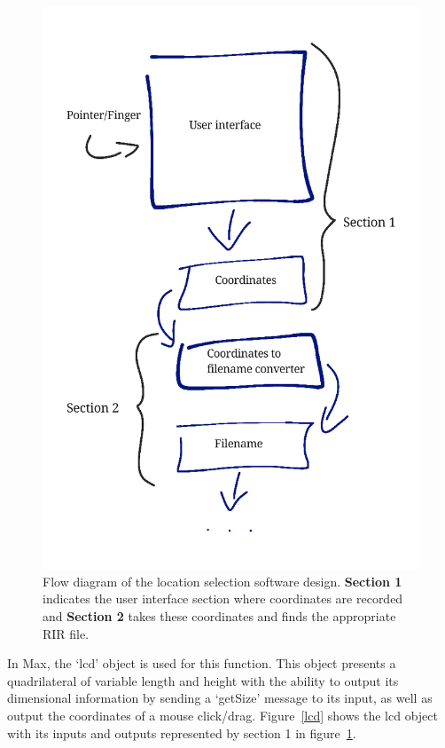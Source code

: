 \documentclass[../../main.tex]{subfiles}
\begin{document}
			\begin{figure}[h]
				\centerline{\includegraphics[scale = 0.25]{Sections/Implementation/Max/images/FlowDiagrams/Max1_V2.png}}
				\caption{Flow diagram of the location selection software design. \textbf{Section 1} indicates the user interface section where coordinates are recorded and \textbf{Section 2} takes these coordinates and finds the appropriate \ac{RIR} file.}
				\label{flowDiagram}
			\end{figure}

			In Max, the ‘lcd’ object is used for this function. This object presents a quadrilateral of variable length and height with the ability to output its dimensional information by sending a ‘getSize’ message to its input, as well as output the coordinates of a mouse click/drag. Figure~\ref{lcd} shows the lcd object with its inputs and outputs represented by section 1 in figure~\ref{flowDiagram}.
\end{document}
